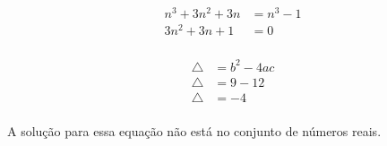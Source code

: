 \begin{question}
	\begin{equation}
	  \begin{split}
	  		n^{3} + 3n^{2} + 3n &= n^{3} -1 \\
	  	   3n^{2} + 3n +1 &= 0 \\ 
		\end{split}
	\end{equation}
	
	\begin{equation}
	  \begin{split}
	  	   \bigtriangleup &= b^{2} -4ac \\
	  	   \bigtriangleup &= 9 -12 \\
	  	   \bigtriangleup &= -4 \\
		\end{split}
	\end{equation}
	
	\begin{center}
		A solução para essa equação não está 
	   no conjunto de números reais.
	\end{center}

\end{question}
